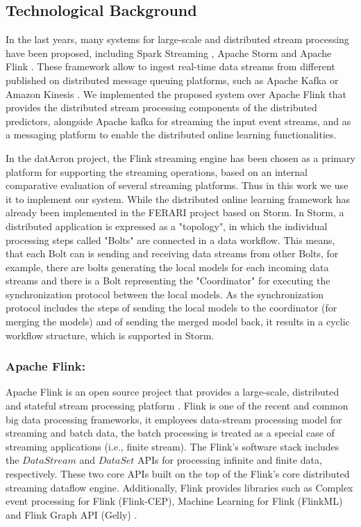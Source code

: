 \subsection{Technological Background}
In the last years, many systems for large-scale and distributed stream processing have been proposed, including Spark Streaming \cite{Spark},  Apache Storm \cite{Storm} and Apache Flink \cite{Flink}. These framework allow to ingest real-time data streams from different published on distributed message queuing platforms, such as Apache Kafka \cite{Kafka} or  Amazon Kinesis \cite{Kinesis}. We implemented the proposed system over Apache Flink that provides the distributed stream processing components of the distributed predictors, alongside  Apache kafka for streaming the input event streams, and as a messaging platform to enable the distributed online learning functionalities.


\par In the datAcron project, the Flink streaming engine has been chosen as a primary platform for supporting the streaming operations, based on an internal comparative evaluation of several streaming platforms. Thus in this work we use it to implement our system. While the distributed online learning framework has already been implemented in the FERARI project \cite{flouris2016ferari}  based on Storm. In Storm, a distributed application is expressed as a "topology", in which the individual processing steps called "Bolts" are connected
in a data workflow. This means, that each Bolt can is sending and receiving data streams from other Bolts, for example, there are bolts generating
the local models for each incoming data streams and there is a Bolt representing the "Coordinator" for executing the synchronization protocol between
the local models. As the synchronization protocol includes the steps of sending the local models to the coordinator (for merging the models) and of sending
the merged model back, it results in a cyclic workflow structure, which is supported in Storm. 

\subsubsection*{Apache Flink:\\}

\par Apache Flink is an open source project that provides a large-scale, distributed and stateful stream processing platform \cite{carbone2015apache}. Flink is one of the recent and common big data processing frameworks, it employees data-stream processing model for streaming and batch data, the batch processing is treated as a special case of streaming applications (i.e., finite stream). The Flink's software stack includes the  $DataStream$ and $DataSet$ APIs for processing infinite and finite data, respectively. These two core APIs built on the top of the Flink's core distributed streaming dataflow engine. Additionally, Flink provides libraries such as Complex event processing for Flink (Flink-CEP), Machine Learning for Flink (FlinkML) and Flink Graph API (Gelly) \cite{carbone2015apache}.

